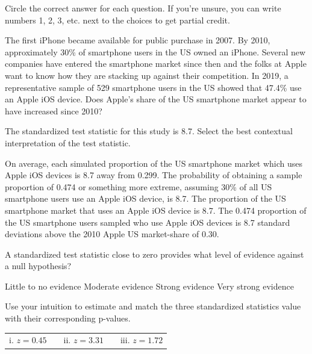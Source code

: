 \documentclass{article}
\begin{document}
	Circle the correct answer for each question.  If you're unsure, you can write numbers 1, 2, 3, etc. next to the choices to get partial credit.\\[.5cm]
	\begin{mcquestions}
		
	\question The first iPhone became available for public purchase in 2007.  By 2010, approximately 30\% of smartphone users in the US owned an iPhone.  Several new companies have entered the smartphone market since then and the folks at Apple want to know how they are stacking up against their competition.  In 2019, a representative sample of 529 smartphone users in the US showed that 47.4\% use an Apple iOS device.  Does Apple's share of the US smartphone market appear to have increased since 2010?
	
	The standardized test statistic for this study is 8.7. Select the best contextual interpretation of the test statistic.
	
	\begin{mcanswerslist}
		\answer On average, each simulated proportion of the US smartphone market which uses Apple iOS devices is 8.7 away from 0.299.
		\answer The probability of obtaining a sample proportion of 0.474 or something more extreme, assuming 30\% of all US smartphone users use an Apple iOS device, is 8.7.
		\answer The proportion of the US smartphone market that uses an Apple iOS device is 8.7.
		\answer[correct] The 0.474 proportion of the US smartphone users sampled who use Apple iOS devices is 8.7 standard deviations above the 2010 Apple US market-share of 0.30.
	\end{mcanswerslist}
	
	\question A standardized test statistic close to zero provides what level of evidence against a null hypothesis?
	\begin{mcanswerslist}
		\answer[correct] Little to no evidence
		\answer Moderate evidence
		\answer Strong evidence
		\answer Very strong evidence
	\end{mcanswerslist}
	
	\question Use your intuition to estimate and match the three standardized statistics value with their corresponding p-values.
	
	\begin{tabular}{lp{1in}cp{1in}r}
		i. $z=0.45$ && ii. $z=3.31$ && iii. $z=1.72$
	\end{tabular}
	

\end{mcquestions}
\end{document}
